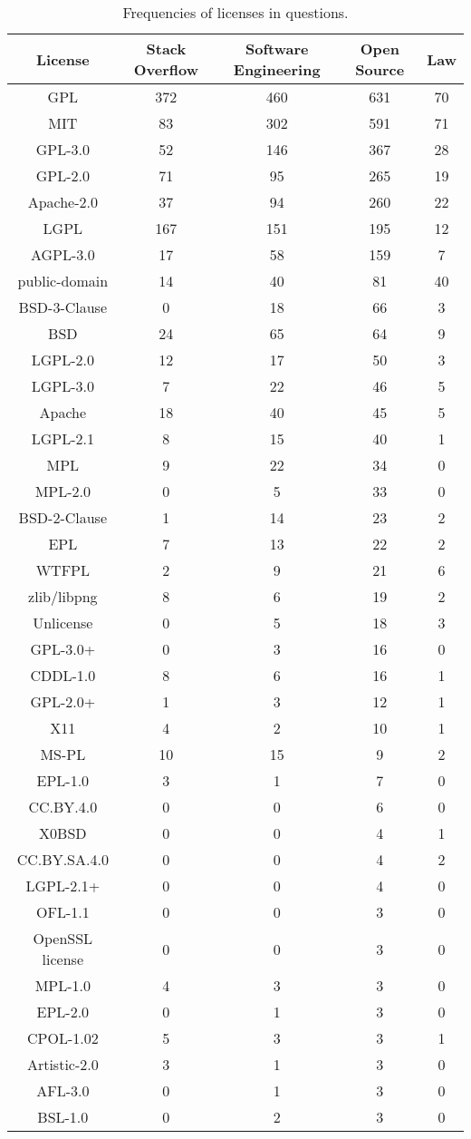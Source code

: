\documentclass{elsarticle}
\begin{document}
\begin{table*}
  \caption{Frequencies of licenses in questions.}
  \label{tab:licenses-qa-sites-freqs}
  \centering
  \begin{adjustbox}{width=0.9\textwidth}
  \begin{tabular}{ccccc}
    \hline
    \textbf{License}& \textbf{Stack Overflow} & \textbf{Software Engineering} & \textbf{Open Source} & \textbf{Law}  \\
     \hline
GPL	&372	&460	&631	&70\\
MIT	&83	&302	&591	&71\\
GPL-3.0	&52	&146	&367	&28\\
GPL-2.0	&71	&95	&265	&19\\
Apache-2.0	&37	&94	&260	&22\\
LGPL	&167	&151	&195	&12\\
AGPL-3.0	&17	&58	&159	&7\\
public-domain	&14	&40	&81	&40\\
BSD-3-Clause	&0	&18	&66	&3\\
BSD	&24	&65	&64	&9\\
LGPL-2.0	&12	&17	&50	&3\\
LGPL-3.0	&7	&22	&46	&5\\
Apache	&18	&40	&45	&5\\
LGPL-2.1	&8	&15	&40	&1\\
MPL	&9	&22	&34	&0\\
MPL-2.0	&0	&5	&33 &0\\
BSD-2-Clause	&1	&14	&23	&2\\
EPL	&7	&13	&22	&2\\
WTFPL	&2	&9	&21	&6\\
zlib/libpng	&8	&6	&19	&2\\
Unlicense	&0	&5	&18	&3\\
GPL-3.0+	&0	&3	&16	&0\\
CDDL-1.0	&8	&6	&16	&1\\
GPL-2.0+	&1	&3	&12	&1\\
X11	&4	&2	&10	&1\\
MS-PL	&10	&15	&9	&2\\
EPL-1.0	&3	&1	&7	&0\\
CC.BY.4.0	&0	&0	&6	&0\\
X0BSD	&0	&0	&4	&1\\
CC.BY.SA.4.0	&0	&0	&4	&2\\
LGPL-2.1+	&0	&0	&4	&0\\
OFL-1.1	&0	&0	&3	&0\\
OpenSSL license	&0	&0	&3	&0\\
MPL-1.0	&4	&3	&3	&0\\
EPL-2.0	&0	&1	&3	&0\\
CPOL-1.02	&5	&3	&3	&1\\
Artistic-2.0	&3	&1	&3	&0\\
AFL-3.0	&0	&1	&3	&0\\
BSL-1.0	&0	&2	&3	&0\\
 \hline
\end{tabular}
\end{adjustbox}
\end{table*}
\end{document}
